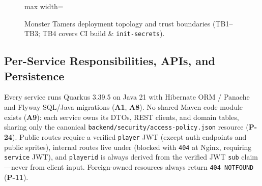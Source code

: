 \documentclass[10.5pt,a4paper]{article}
\DeclareRobustCommand{\code}[1]{\begingroup\def\_{\textunderscore\allowbreak}\texttt{#1}\endgroup}
\begin{document}
\begin{figure}[H]
\begin{adjustbox}{max width=\linewidth}
\end{adjustbox}
\caption{Monster Tamers deployment topology and trust boundaries (TB1–TB3; TB4 covers CI build \& \code{init-secrets}).}
\label{fig:arch}
\end{figure}

\subsection{Per-Service Responsibilities, APIs, and Persistence}

Every service runs Quarkus 3.39.5 on Java 21 with Hibernate ORM / Panache and Flyway SQL/Java migrations (\textbf{A1}, \textbf{A8}). No shared Maven code module exists (\textbf{A9}): each service owns its DTOs, REST clients, and domain tables, sharing only the canonical \code{backend/security/access-policy.json} resource (\textbf{P-24}). Public routes require a verified \code{player} JWT (except auth endpoints and public sprites), internal routes live under  (blocked with \code{404} at Nginx, requiring \code{service} JWT), and \code{player\_id} is always derived from the verified JWT \code{sub} claim—never from client input. Foreign-owned resources always return \code{404 NOT\_FOUND} (\textbf{P-11}).
\end{document}
